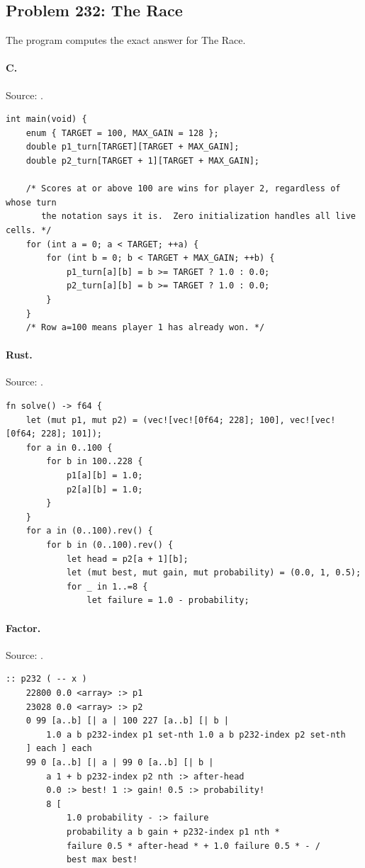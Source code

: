 \subsection{Problem 232: The Race}
\label{walkthrough:p232}
The program computes the exact answer for The Race.

\paragraph{C.} Source: .
\begin{lstlisting}
int main(void) {
    enum { TARGET = 100, MAX_GAIN = 128 };
    double p1_turn[TARGET][TARGET + MAX_GAIN];
    double p2_turn[TARGET + 1][TARGET + MAX_GAIN];

    /* Scores at or above 100 are wins for player 2, regardless of whose turn
       the notation says it is.  Zero initialization handles all live cells. */
    for (int a = 0; a < TARGET; ++a) {
        for (int b = 0; b < TARGET + MAX_GAIN; ++b) {
            p1_turn[a][b] = b >= TARGET ? 1.0 : 0.0;
            p2_turn[a][b] = b >= TARGET ? 1.0 : 0.0;
        }
    }
    /* Row a=100 means player 1 has already won. */
\end{lstlisting}

\paragraph{Rust.} Source: .
\begin{lstlisting}
fn solve() -> f64 {
    let (mut p1, mut p2) = (vec![vec![0f64; 228]; 100], vec![vec![0f64; 228]; 101]);
    for a in 0..100 {
        for b in 100..228 {
            p1[a][b] = 1.0;
            p2[a][b] = 1.0;
        }
    }
    for a in (0..100).rev() {
        for b in (0..100).rev() {
            let head = p2[a + 1][b];
            let (mut best, mut gain, mut probability) = (0.0, 1, 0.5);
            for _ in 1..=8 {
                let failure = 1.0 - probability;
\end{lstlisting}

\paragraph{Factor.} Source: .
\begin{lstlisting}
:: p232 ( -- x )
    22800 0.0 <array> :> p1
    23028 0.0 <array> :> p2
    0 99 [a..b] [| a | 100 227 [a..b] [| b |
        1.0 a b p232-index p1 set-nth 1.0 a b p232-index p2 set-nth
    ] each ] each
    99 0 [a..b] [| a | 99 0 [a..b] [| b |
        a 1 + b p232-index p2 nth :> after-head
        0.0 :> best! 1 :> gain! 0.5 :> probability!
        8 [
            1.0 probability - :> failure
            probability a b gain + p232-index p1 nth *
            failure 0.5 * after-head * + 1.0 failure 0.5 * - /
            best max best!
\end{lstlisting}

